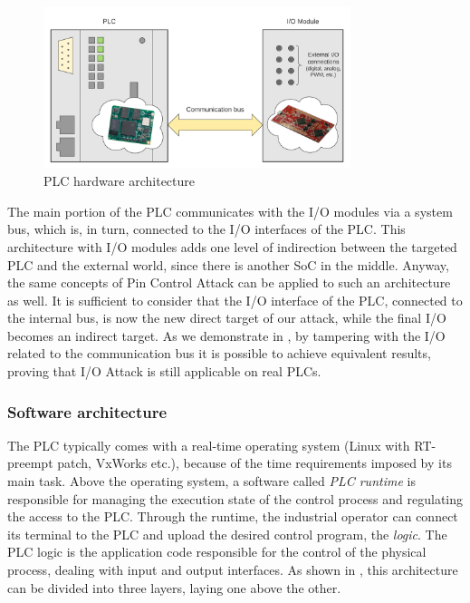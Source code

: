 \begin{figure}[h]
\centerline{\includegraphics[width=0.8\textwidth]{res/plc-arch}}
\caption{PLC hardware architecture \label{fig:plc-arch}}
\end{figure}

The main portion of the PLC communicates with the I/O modules via a system bus, which is, in turn, connected to the I/O interfaces of the PLC.
This architecture with I/O modules adds one level of indirection between the targeted PLC and the external world, since there is another SoC in the middle.
Anyway, the same concepts of Pin Control Attack can be applied to such an architecture as well. It is sufficient to consider that the I/O interface of the PLC,
connected to the internal bus, is now the new direct target of our attack, while the final I/O becomes an indirect target. As we demonstrate in ,
by tampering with the I/O related to the communication bus it is possible to achieve equivalent results, proving that I/O Attack is still applicable on real PLCs.


\subsubsection{Software architecture}

The PLC typically comes with a real-time operating system (\eg Linux with RT-preempt patch, VxWorks etc.), because of the time requirements imposed by its main task.
Above the operating system, a software called \emph{PLC runtime} is responsible for managing the execution state of the control process and regulating the access to the PLC.
Through the runtime, the industrial operator can connect its terminal to the PLC and upload the desired control program, the \emph{logic}.
The PLC logic is the application code responsible for the control of the physical process, dealing with input and output interfaces.
As shown in , this architecture can be divided into three layers, laying one above the other.

